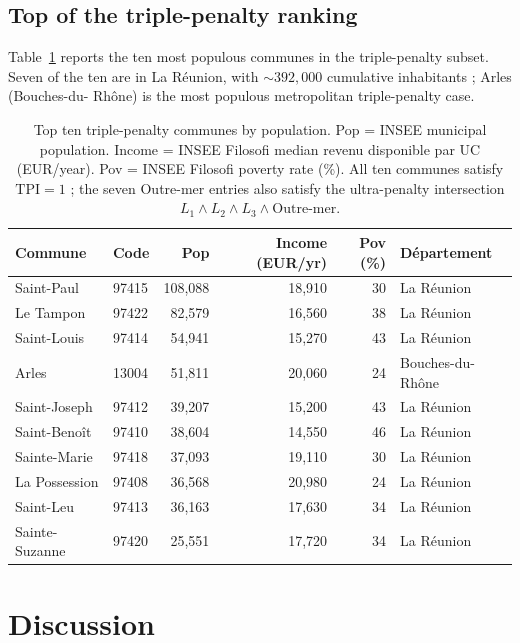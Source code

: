 \documentclass[11pt,a4paper]{article}
\newcommand{\TPI}{\mathrm{TPI}}
\begin{document}
\subsection{Top of the triple-penalty ranking}

Table~\ref{tab:tpi-top} reports the ten most populous communes
in the triple-penalty subset.  Seven of the ten are in La R\'eunion,
with $\sim 392{,}000$ cumulative inhabitants ; Arles (Bouches-du-
Rh\^one) is the most populous metropolitan triple-penalty case.

\begin{table}[H]
\centering
\caption{Top ten triple-penalty communes by population.
Pop = INSEE municipal population.  Income = INSEE Filosofi
median revenu disponible par UC (EUR/year).  Pov = INSEE Filosofi
poverty rate (\%).  All ten communes satisfy $\TPI = 1$ ; the
seven Outre-mer entries also satisfy the ultra-penalty
intersection $L_1 \land L_2 \land L_3 \land \text{Outre-mer}$.}
\label{tab:tpi-top}
\small
\begin{tabular}{@{}llrrrl@{}}
\toprule
Commune & Code & Pop & Income (EUR/yr) & Pov (\%) & D\'epartement \\
\midrule
Saint-Paul          & 97415 & 108{,}088 & 18{,}910 & 30 & La R\'eunion \\
Le Tampon           & 97422 &  82{,}579 & 16{,}560 & 38 & La R\'eunion \\
Saint-Louis         & 97414 &  54{,}941 & 15{,}270 & 43 & La R\'eunion \\
Arles               & 13004 &  51{,}811 & 20{,}060 & 24 & Bouches-du-Rh\^one \\
Saint-Joseph        & 97412 &  39{,}207 & 15{,}200 & 43 & La R\'eunion \\
Saint-Beno\^it      & 97410 &  38{,}604 & 14{,}550 & 46 & La R\'eunion \\
Sainte-Marie        & 97418 &  37{,}093 & 19{,}110 & 30 & La R\'eunion \\
La Possession       & 97408 &  36{,}568 & 20{,}980 & 24 & La R\'eunion \\
Saint-Leu           & 97413 &  36{,}163 & 17{,}630 & 34 & La R\'eunion \\
Sainte-Suzanne      & 97420 &  25{,}551 & 17{,}720 & 34 & La R\'eunion \\
\bottomrule
\end{tabular}
\end{table}

\section{Discussion}
\label{sec:discussion}
\end{document}
